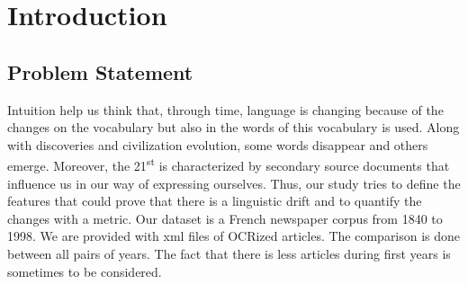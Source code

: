 \section{Introduction}

\subsection{Problem Statement}
Intuition help us think that, through time, language is changing because of the changes on the vocabulary but also in the words of this vocabulary is used.
Along with discoveries and civilization evolution, some words disappear and others emerge. Moreover, the 21\textsuperscript{st} is characterized by secondary source documents that influence us in our way of expressing ourselves. Thus, our study tries to define the features that could prove that there is a linguistic drift and to quantify the changes with a metric.
Our dataset is a French newspaper corpus from 1840 to 1998. We are provided with xml files of OCRized articles. The comparison is done between all pairs of years. The fact that there is less articles during first years is sometimes to be considered.
